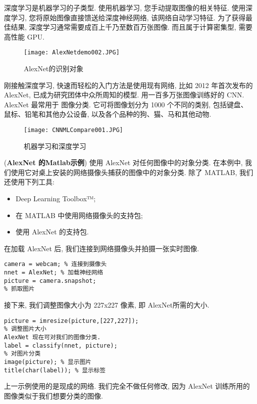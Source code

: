 深度学习是机器学习的子类型. 使用机器学习, 您手动提取图像的相关特征. 使用深度学习, 您将原始图像直接馈送给深度神经网络, 该网络自动学习特征.
为了获得最佳结果, 深度学习通常需要成百上千乃至数百万张图像. 而且属于计算密集型, 需要高性能 GPU.
\begin{figure}[H]
\centering
\texttt{[image: AlexNetdemo002.JPG]}
\caption{AlexNet的识别对象}
\label{AlexNetdemo002}
\end{figure}
刚接触深度学习, 快速而轻松的入门方法是使用现有网络, 比如 2012 年首次发布的AlexNet, 已成为研究团体中众所周知的模型. 用一百多万张图像训练好的 CNN.  AlexNet 最常用于
图像分类. 它可将图像划分为 1000 个不同的类别, 包括键盘、鼠标、铅笔和其他办公设备, 以及各个品种的狗、猫、马和其他动物.
\begin{figure}[H]
\centering
\texttt{[image: CNNMLCompare001.JPG]}
\caption{机器学习和深度学习}
\label{CNNMLCompare001}
\end{figure}
\begin{example}
(\textbf{AlexNet 的Matlab示例}) 使用 AlexNet 对任何图像中的对象分类. 在本例中, 我们使用它对桌上安装的网络摄像头捕获的图像中的对象分类. 除了 MATLAB, 我们还使用下列工具:
\begin{itemize}
\item Deep Learning Toolbox™;
\item 在 MATLAB 中使用网络摄像头的支持包;
\item 使用 AlexNet 的支持包.
\end{itemize}
在加载 AlexNet 后, 我们连接到网络摄像头并拍摄一张实时图像.
\begin{Verbatim}
camera = webcam; % 连接到摄像头
nnet = AlexNet; % 加载神经网络
picture = camera.snapshot;
% 抓取图片
\end{Verbatim}
接下来, 我们调整图像大小为 227x227 像素, 即 AlexNet所需的大小.
\begin{Verbatim}
picture = imresize(picture,[227,227]);
% 调整图片大小
AlexNet 现在可对我们的图像分类.
label = classify(nnet, picture);
% 对图片分类
image(picture); % 显示图片
title(char(label)); % 显示标签
\end{Verbatim}
\end{example}
上一示例使用的是现成的网络. 我们完全不做任何修改, 因为 AlexNet 训练所用的图像类似于我们想要分类的图像.

